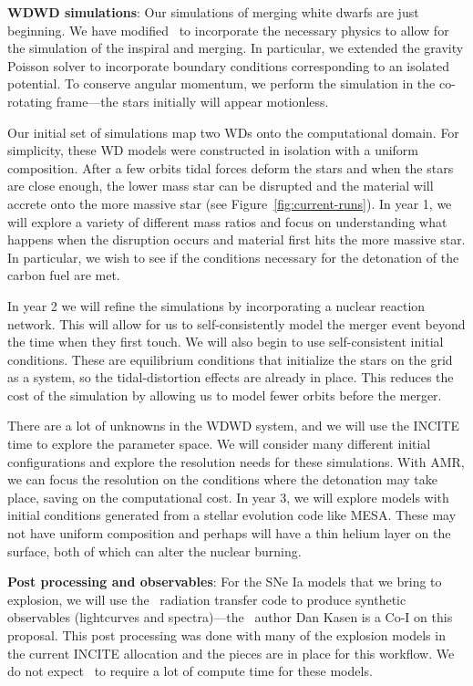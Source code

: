 \documentclass[11pt,letterpaper,english]{article}
\begin{document}
{\bf WDWD simulations}: Our simulations of merging white dwarfs are just
beginning.  We have modified \castro\ to incorporate the necessary physics
to allow for the simulation of the inspiral and merging.  In particular,
we extended the gravity Poisson solver to incorporate boundary conditions 
corresponding to an isolated potential.  To conserve angular momentum, 
we perform the simulation in the co-rotating frame---the
stars initially will appear motionless.

Our initial set of simulations map two WDs onto the computational
domain.  For simplicity, these WD models were constructed in isolation
with a uniform composition.  After a few orbits tidal forces
deform the stars and when the stars are close enough, the lower mass
star can be disrupted and the material will accrete onto the more
massive star (see Figure~\ref{fig:current-runs}).  In year 1, we will explore
a variety of different mass ratios and focus on understanding what happens
when the disruption occurs and material first hits the more massive star.
In particular, we wish to see if the conditions necessary for the detonation
of the carbon fuel are met.

In year 2 we will refine the simulations by incorporating a nuclear
reaction network.  This will allow for us to self-consistently model
the merger event beyond the time when they first touch.  We will also
begin to use self-consistent initial conditions.  These are
equilibrium conditions that initialize the stars on the grid as a
system, so the tidal-distortion effects are already in place.  This
reduces the cost of the simulation by allowing us to model fewer orbits
before the merger.

There are a lot of unknowns in the WDWD system, and we will use the
INCITE time to explore the parameter space.  We will consider many
different initial configurations and explore the resolution needs for
these simulations.  With AMR, we can focus the resolution on the
conditions where the detonation may take place, saving on the
computational cost.  In year 3, we will explore models with initial
conditions generated from a stellar evolution code like MESA.  These
may not have uniform composition and perhaps will have a thin helium
layer on the surface, both of which can alter the nuclear burning.


{\bf Post processing and observables}:  
%
For the SNe Ia models that we bring to explosion, we will use the
\sedona\ radiation transfer code to produce synthetic observables
(lightcurves and spectra)---the \sedona\ author Dan Kasen is a Co-I on
this proposal.  This post processing was done with many of the explosion 
models in the current INCITE allocation and the pieces are in place for this
workflow. We do not expect \sedona\ to require a lot of compute
time for these models.
\end{document}
